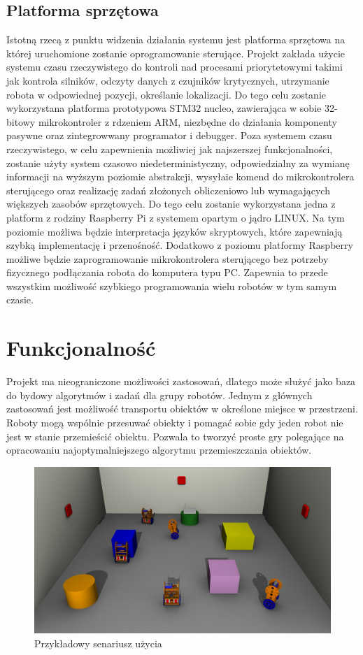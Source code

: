 \documentclass[a4paper, 12pt]{article}
\begin{document}
\subsection{Platforma sprzętowa}
Istotną rzecą z punktu widzenia działania systemu jest platforma sprzętowa na której uruchomione zostanie oprogramowanie sterujące. Projekt zakłada użycie systemu czasu rzeczywistego do kontroli nad procesami priorytetowymi takimi jak kontrola silników, odczyty danych z czujników krytycznych, utrzymanie robota w odpowiednej pozycji, określanie lokalizacji. Do tego celu zostanie wykorzystana platforma prototypowa STM32 nucleo, zawierająca w sobie 32-bitowy mikrokontroler z rdzeniem ARM, niezbędne do działania komponenty pasywne oraz zintegrowwany programator i debugger. Poza systemem czasu rzeczywistego, w celu zapewnienia możliwiej jak najszerszej funkcjonalności, zostanie użyty system czasowo niedeterministyczny, odpowiedzialny za wymianę informacji na wyższym poziomie abstrakcji, wysyłaie komend do mikrokontrolera sterującego oraz realizację zadań złożonych obliczeniowo lub wymagających większych zasobów sprzętowych. Do tego celu zostanie wykorzystana jedna z platform z rodziny Raspberry Pi z systemem opartym o jądro LINUX. Na tym poziomie możliwa będzie interpretacja języków skryptowych, które zapewniają szybką implementację i przenośność. Dodatkowo z poziomu platformy Raspberry możliwe będzie zaprogramowanie mikrokontrolera sterującego bez potrzeby fizycznego podłączania robota do komputera typu PC. Zapewnia to przede wszystkim możliwość szybkiego programowania wielu robotów w tym samym czasie. 

\section{Funkcjonalność}
Projekt ma nieograniczone możliwości zastosowań, dlatego może służyć jako baza do bydowy algorytmów i zadań dla grupy robotów. Jednym z głównych zastosowań jest możliwość transportu obiektów w określone miejsce w przestrzeni. Roboty mogą wspólnie przesuwać obiekty i pomagać sobie gdy jeden robot nie jest w stanie przemieścić obiektu. Pozwala to tworzyć proste gry polegające na opracowaniu najoptymalniejszego algorytmu przemieszczania obiektów. 

\begin{figure}
\centering
\includegraphics[width=15cm]{img/grupa.jpg}
\caption{Przykładowy senariusz użycia}
\label{fig:grupa}
\end{figure}
\end{document}
